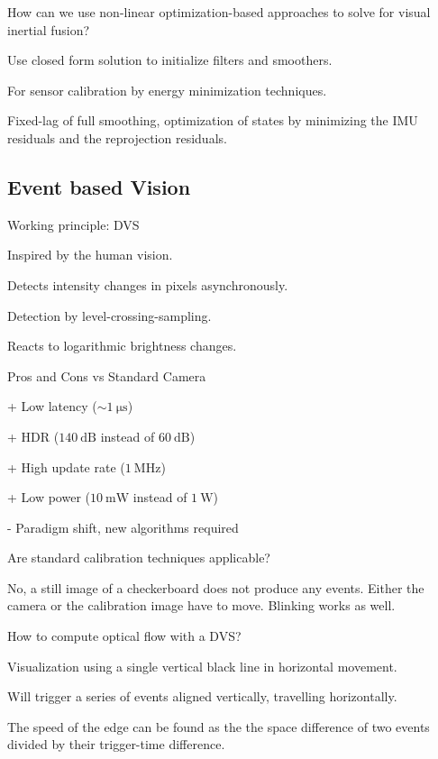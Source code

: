\documentclass[10pt,a4paper]{scrartcl}
\begin{document}
\begin{multicols*}{2}
\begin{QandA}
{How can we use non-linear optimization-based approaches to solve for visual inertial fusion?}
\item Use closed form solution to initialize filters and smoothers.
\item For sensor calibration by energy minimization techniques.
\item Fixed-lag of full smoothing, optimization of states by minimizing the IMU residuals and the reprojection residuals.
\end{QandA}

\subsection*{Event based Vision}

\begin{QandA}
{Working principle: DVS}
\item Inspired by the human vision.
\item Detects intensity changes in pixels asynchronously.
\item Detection by level-crossing-sampling.
\item Reacts to logarithmic brightness changes.

\end{QandA}

\begin{QandA}
{Pros and Cons vs Standard Camera}
\item[+] Low latency ($\sim\SI{1}{\micro\second}$)
\item[+] HDR ($\SI{140}{\dB}$ instead of $\SI{60}{\dB}$)
\item[+] High update rate ($\SI{1}{\mega\hertz}$)
\item[+] Low power ($\SI{10}{\milli\watt}$ instead of $\SI{1}{\watt}$)
\item[-] Paradigm shift, new algorithms required
\end{QandA}

\begin{QandA}
{Are standard calibration techniques applicable?}
\item No, a still image of a checkerboard does not produce any events. Either the camera or the calibration image have to move. Blinking works as well.
\end{QandA}

\begin{QandA}
{How to compute optical flow with a DVS?}
\item Visualization using a single vertical black line in horizontal movement.
\item Will trigger a series of events aligned vertically, travelling horizontally.
\item The speed of the edge can be found as the the space difference of two events divided by their trigger-time difference. 
\end{QandA}


\end{multicols*}
\end{document}
